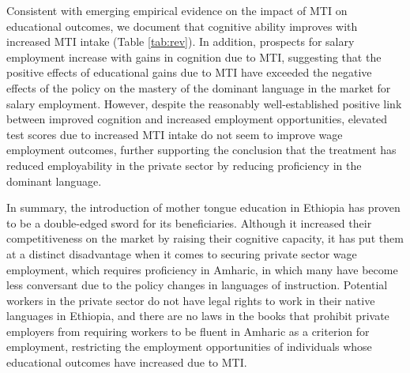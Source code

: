 Consistent with emerging empirical evidence on the impact of MTI on educational outcomes, we document that cognitive ability improves with increased MTI intake (Table \ref{tab:rev}). In addition, prospects for salary employment increase with gains in cognition due to MTI, suggesting that the positive effects of educational gains due to MTI have exceeded the negative effects of the policy on the mastery of the dominant language in the market for salary employment. However, despite the reasonably well-established positive link between improved cognition and increased employment opportunities, elevated test scores due to increased MTI intake do not seem to improve wage employment outcomes, further supporting the conclusion that the treatment has reduced employability in the private sector by reducing proficiency in the dominant language. 



In summary, the introduction of mother tongue education in Ethiopia has proven to be a double-edged sword for its beneficiaries. Although it increased their competitiveness on the market by raising their cognitive capacity, it has put them at a distinct disadvantage when it comes to securing private sector wage employment, which requires proficiency in Amharic, in which many have become less conversant due to the policy changes in languages of instruction. Potential workers in the private sector do not have legal rights to work in their native languages in Ethiopia, and there are no laws in the books that prohibit private employers from requiring workers to be fluent in Amharic as a criterion for employment, restricting the employment opportunities of individuals whose educational outcomes have increased due to MTI. 

  



